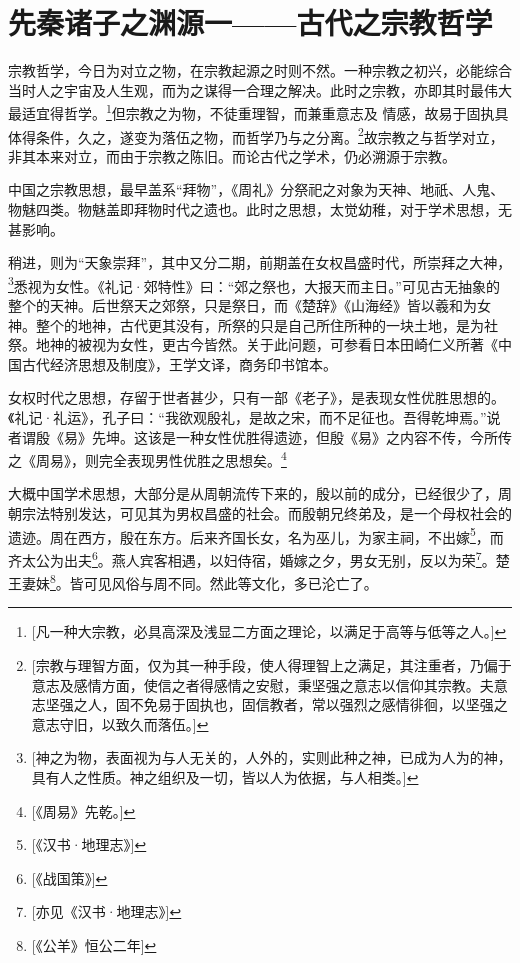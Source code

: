 \chapter{先秦诸子之渊源一——古代之宗教哲学}

宗教哲学，今日为对立之物，在宗教起源之时则不然。一种宗教之初兴，必能综合当时人之宇宙及人生观，而为之谋得一合理之解决。此时之宗教，亦即其时最伟大最适宜得哲学。\footnote{[凡一种大宗教，必具高深及浅显二方面之理论，以满足于高等与低等之人。]}但宗教之为物，不徒重理智，而兼重意志及 情感，故易于固执具体得条件，久之，遂变为落伍之物，而哲学乃与之分离。\footnote{[宗教与理智方面，仅为其一种手段，使人得理智上之满足，其注重者，乃偏于意志及感情方面，使信之者得感情之安慰，秉坚强之意志以信仰其宗教。夫意志坚强之人，固不免易于固执也，固信教者，常以强烈之感情徘徊，以坚强之意志守旧，以致久而落伍。]}故宗教之与哲学对立，非其本来对立，而由于宗教之陈旧。而论古代之学术，仍必溯源于宗教。

中国之宗教思想，最早盖系“拜物”，《周礼》分祭祀之对象为天神、地祇、人鬼、物魅四类。物魅盖即拜物时代之遗也。此时之思想，太觉幼稚，对于学术思想，无甚影响。

稍进，则为“天象崇拜”，其中又分二期，前期盖在女权昌盛时代，所崇拜之大神，\footnote{[神之为物，表面视为与人无关的，人外的，实则此种之神，已成为人为的神，具有人之性质。神之组织及一切，皆以人为依据，与人相类。]}悉视为女性。《礼记·郊特性》曰：“郊之祭也，大报天而主日。”可见古无抽象的整个的天神。后世祭天之郊祭，只是祭日，而《楚辞》《山海经》皆以羲和为女神。整个的地神，古代更其没有，所祭的只是自己所住所种的一块土地，是为社祭。地神的被视为女性，更古今皆然。关于此问题，可参看日本田崎仁义所著《中国古代经济思想及制度》，王学文译，商务印书馆本。

女权时代之思想，存留于世者甚少，只有一部《老子》，是表现女性优胜思想的。《礼记·礼运》，孔子曰：“我欲观殷礼，是故之宋，而不足征也。吾得乾坤焉。”说者谓殷《易》先坤。这该是一种女性优胜得遗迹，但殷《易》之内容不传，今所传之《周易》，则完全表现男性优胜之思想矣。\footnote{[《周易》先乾。]}

大概中国学术思想，大部分是从周朝流传下来的，殷以前的成分，已经很少了，周朝宗法特别发达，可见其为男权昌盛的社会。而殷朝兄终弟及，是一个母权社会的遗迹。周在西方，殷在东方。后来齐国长女，名为巫儿，为家主祠，不出嫁\footnote{[《汉书·地理志》]}，而齐太公为出夫\footnote{[《战国策》]}。燕人宾客相遇，以妇侍宿，婚嫁之夕，男女无别，反以为荣\footnote{[亦见《汉书·地理志》]}。楚王妻妹\footnote{[《公羊》恒公二年]}。皆可见风俗与周不同。然此等文化，多已沦亡了。

